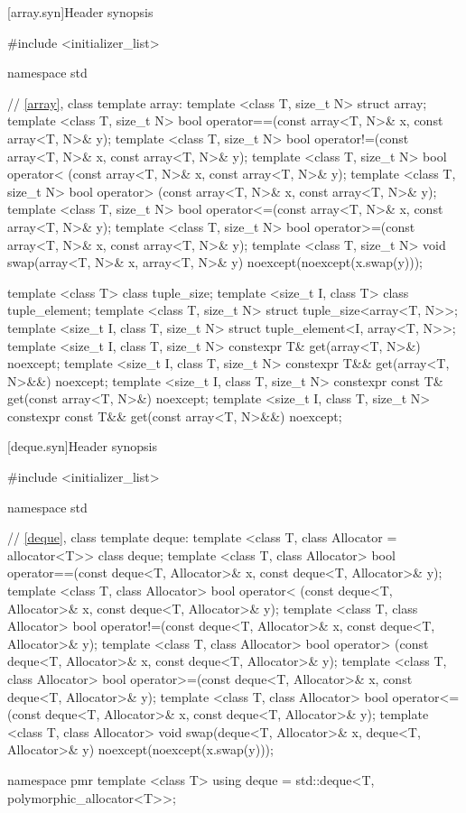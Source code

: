 [array.syn]{Header  synopsis}

%
\begin{codeblock}
#include <initializer_list>

namespace std {
  // \ref{array}, class template array:
  template <class T, size_t N> struct array;
  template <class T, size_t N>
    bool operator==(const array<T, N>& x, const array<T, N>& y);
  template <class T, size_t N>
    bool operator!=(const array<T, N>& x, const array<T, N>& y);
  template <class T, size_t N>
    bool operator< (const array<T, N>& x, const array<T, N>& y);
  template <class T, size_t N>
    bool operator> (const array<T, N>& x, const array<T, N>& y);
  template <class T, size_t N>
    bool operator<=(const array<T, N>& x, const array<T, N>& y);
  template <class T, size_t N>
    bool operator>=(const array<T, N>& x, const array<T, N>& y);
  template <class T, size_t N>
    void swap(array<T, N>& x, array<T, N>& y) noexcept(noexcept(x.swap(y)));

  template <class T> class tuple_size;
  template <size_t I, class T> class tuple_element;
  template <class T, size_t N>
    struct tuple_size<array<T, N>>;
  template <size_t I, class T, size_t N>
    struct tuple_element<I, array<T, N>>;
  template <size_t I, class T, size_t N>
    constexpr T& get(array<T, N>&) noexcept;
  template <size_t I, class T, size_t N>
    constexpr T&& get(array<T, N>&&) noexcept;
  template <size_t I, class T, size_t N>
    constexpr const T& get(const array<T, N>&) noexcept;
  template <size_t I, class T, size_t N>
    constexpr const T&& get(const array<T, N>&&) noexcept;
}
\end{codeblock}

[deque.syn]{Header  synopsis}


\begin{codeblock}
#include <initializer_list>

namespace std {
  // \ref{deque}, class template deque:
  template <class T, class Allocator = allocator<T>> class deque;
  template <class T, class Allocator>
    bool operator==(const deque<T, Allocator>& x, const deque<T, Allocator>& y);
  template <class T, class Allocator>
    bool operator< (const deque<T, Allocator>& x, const deque<T, Allocator>& y);
  template <class T, class Allocator>
    bool operator!=(const deque<T, Allocator>& x, const deque<T, Allocator>& y);
  template <class T, class Allocator>
    bool operator> (const deque<T, Allocator>& x, const deque<T, Allocator>& y);
  template <class T, class Allocator>
    bool operator>=(const deque<T, Allocator>& x, const deque<T, Allocator>& y);
  template <class T, class Allocator>
    bool operator<=(const deque<T, Allocator>& x, const deque<T, Allocator>& y);
  template <class T, class Allocator>
    void swap(deque<T, Allocator>& x, deque<T, Allocator>& y)
      noexcept(noexcept(x.swap(y)));

  namespace pmr {
    template <class T>
      using deque = std::deque<T, polymorphic_allocator<T>>;
  }
}
\end{codeblock}

